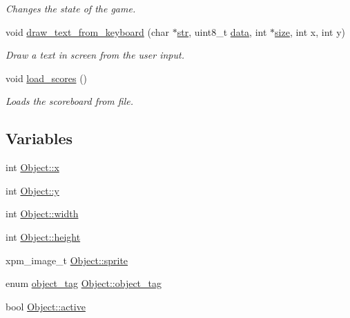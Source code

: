 \begin{DoxyCompactItemize}
\begin{DoxyCompactList}\small\item\em Changes the state of the game. \end{DoxyCompactList}\item 
void \hyperlink{group__utils_gabe39d5da16482ce154af88c3f78a1000}{draw\+\_\+text\+\_\+from\+\_\+keyboard} (char $\ast$\hyperlink{group__Game-Over-Menu_gae3b2d5dad8a568a12752edcea2435e50}{str}, uint8\+\_\+t \hyperlink{group__Proj_ga325819a8e492ac69542e8b31705af6e9}{data}, int $\ast$\hyperlink{group__Game-Over-Menu_ga439227feff9d7f55384e8780cfc2eb82}{size}, int x, int y)
\begin{DoxyCompactList}\small\item\em Draw a text in screen from the user input. \end{DoxyCompactList}\item 
void \hyperlink{group__utils_ga1214184725b2f89d6ae427ecd9041295}{load\+\_\+scores} ()
\begin{DoxyCompactList}\small\item\em Loads the scoreboard from file. \end{DoxyCompactList}\end{DoxyCompactItemize}
\subsection*{Variables}
\begin{DoxyCompactItemize}
\item 
int \hyperlink{group__utils_gaea8b4e1f4895ce5a0be5dbf42864669c}{Object\+::x}
\item 
int \hyperlink{group__utils_ga9ed372592e77352c832d721ad88b9aec}{Object\+::y}
\item 
int \hyperlink{group__utils_ga93596e8f620874b99326f8632365c8f5}{Object\+::width}
\item 
int \hyperlink{group__utils_gacda1358783bae0b0071ae66e3fc26737}{Object\+::height}
\item 
xpm\+\_\+image\+\_\+t \hyperlink{group__utils_gaa49ab131cd6d6c156d2c78c6501ba17c}{Object\+::sprite}
\item 
enum \hyperlink{group__utils_ga3eff9ebd9f241e211e00b991e2ac60fc}{object\+\_\+tag} \hyperlink{group__utils_gaac0293be1f10fd2268ddeaac7184600d}{Object\+::object\+\_\+tag}
\item 
bool \hyperlink{group__utils_gac16b5f9f4fa1d1787dd0937b48d62377}{Object\+::active}
\end{DoxyCompactItemize}


